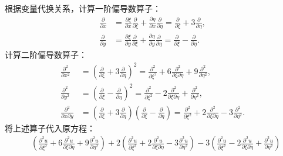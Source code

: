 \begin{myproof}
    根据变量代换关系，计算一阶偏导数算子：
    \begin{equation}
        \label{eq:operator-1}
        \begin{aligned}
            \frac{\partial}{\partial x} & = \frac{\partial \xi}{\partial x} \frac{\partial}{\partial \xi} + \frac{\partial \eta}{\partial x} \frac{\partial}{\partial \eta} = \frac{\partial}{\partial \xi} + 3 \frac{\partial}{\partial \eta}, \\
            \frac{\partial}{\partial y} & = \frac{\partial \xi}{\partial y} \frac{\partial}{\partial \xi} + \frac{\partial \eta}{\partial y} \frac{\partial}{\partial \eta} = \frac{\partial}{\partial \xi} - \frac{\partial}{\partial \eta}.
        \end{aligned}
    \end{equation}
    计算二阶偏导数算子：
    \begin{equation}
        \begin{aligned}
            \frac{\partial^2}{\partial x^2}          & = \left( \frac{\partial}{\partial \xi} + 3 \frac{\partial}{\partial \eta} \right)^2 = \frac{\partial^2}{\partial \xi^2} + 6 \frac{\partial^2}{\partial \xi \partial \eta} + 9 \frac{\partial^2}{\partial \eta^2},                                                                             \\
            \frac{\partial^2}{\partial y^2}          & = \left( \frac{\partial}{\partial \xi} - \frac{\partial}{\partial \eta} \right)^2 = \frac{\partial^2}{\partial \xi^2} - 2 \frac{\partial^2}{\partial \xi \partial \eta} + \frac{\partial^2}{\partial \eta^2},                                                                                 \\
            \frac{\partial^2}{\partial x \partial y} & = \left( \frac{\partial}{\partial \xi} + 3 \frac{\partial}{\partial \eta} \right) \left( \frac{\partial}{\partial \xi} - \frac{\partial}{\partial \eta} \right) = \frac{\partial^2}{\partial \xi^2} + 2 \frac{\partial^2}{\partial \xi \partial \eta} - 3 \frac{\partial^2}{\partial \eta^2}.
        \end{aligned}
    \end{equation}
    将上述算子代入原方程：
    \begin{equation}
        \begin{aligned}
             & \left( \frac{\partial^2 u}{\partial \xi^2} + 6 \frac{\partial^2 u}{\partial \xi \partial \eta} + 9 \frac{\partial^2 u}{\partial \eta^2} \right) + 2 \left( \frac{\partial^2 u}{\partial \xi^2} + 2 \frac{\partial^2 u}{\partial \xi \partial \eta} - 3 \frac{\partial^2 u}{\partial \eta^2} \right) - 3 \left( \frac{\partial^2 u}{\partial \xi^2} - 2 \frac{\partial^2 u}{\partial \xi \partial \eta} + \frac{\partial^2 u}{\partial \eta^2} \right) \\

\end{aligned}
\end{equation}
\end{myproof}
